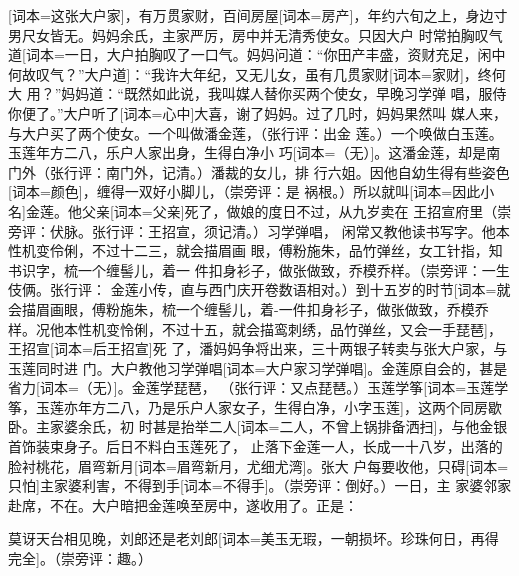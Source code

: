 \documentclass[UTF8,scheme=chinese,11pt,linespread=1.4]{ctexbook}
\makeatletter
\newcommand{\banben}[2][]{#2}
\newenvironment{diben}[1]
  {\list{}{\listparindent 2em
    \itemindent\listparindent
    \rightmargin 0em  %
    \leftmargin 0em  %
    \parsep \z@ \@plus\p@}%
   \item\relax}
  {\endlist}
\makeatother
\begin{document}
\begin{diben}
\banben{却说这张大户}[词本={这张大户家}]，有万贯家财，百间\banben{房屋}[词本={房产}]，年约六旬之上，身边寸
男尺女皆无。妈妈余氏，主家严厉，房中并无清秀使女。\banben{只因大户
时常拍胸叹气道}[词本={一日，大户拍胸叹了一口气。妈妈问道：“你田产丰盛，资财充足，闲中何故叹气？”大户道}]：“我许大年纪，又无儿女，虽有\banben{几贯家财}[词本={家财}]，终何大
用？”妈妈道：“既然如此说，我叫媒人替你买两个使女，早晚习学弹
唱，服侍你便了。”大户\banben{听了}[词本={心中}]大喜，谢了妈妈。过了几时，妈妈果然叫
媒人来，与大户买了两个使女。一个叫做潘金莲，（张行评：出金
莲。）一个唤做白玉莲。\banben{玉莲年方二八，乐户人家出身，生得白净小
巧}[词本={（无）}]。这潘金莲，却是南门外（张行评：南门外，记清。）潘裁的女儿，排
行六姐。因他自幼生得有些\banben{姿色}[词本={颜色}]，缠得一双好小脚儿，（崇旁评：是
祸根。）\banben{所以就叫}[词本={因此小名}]金莲。\banben{他父亲}[词本={父亲}]死了，做娘的度日不过，从九岁卖在
王招宣府里（崇旁评：伏脉。张行评：王招宣，须记清。）习学弹唱，
\banben{闲常又教他读书写字。他本性机变伶俐，不过十二三，就会描眉画
眼，傅粉施朱，品竹弹丝，女工针指，知书识字，梳一个缠髻儿，着一
件扣身衫子，做张做致，乔模乔样。（崇旁评：一生伎俩。张行评：
金莲小传，直与西门庆开卷数语相对。）到十五岁的时节}[词本={就会描眉画眼，傅粉施朱，梳一个缠髻儿，着-一件扣身衫子，做张做致，乔模乔样。况他本性机变怜俐，不过十五，就会描鸾刺绣，品竹弹丝，又会一手琵琶}]，\banben{王招宣}[词本={后王招宣}]死
了，潘妈妈争将出来，三十两银子转卖与张大户家，与玉莲同时进
门。\banben{大户教他习学弹唱}[词本={大户家习学弹唱}]。\banben{金莲原自会的，甚是省力}[词本={（无）}]。金莲学琵琶，
（张行评：又点琵琶。）\banben{玉莲学筝}[词本={玉莲学筝，玉莲亦年方二八，乃是乐户人家女子，生得白净，小字玉莲}]，这两个同房歇卧。主家婆余氏，初
时甚是抬举\banben{二人}[词本={二人，不曾上锅排备洒扫}]，与他金银首饰装束身子。后日不料白玉莲死了，
止落下金莲一人，长成一十八岁，出落的脸衬桃花，\banben{眉弯新月}[词本={眉弯新月，尤细尤湾}]。张大
户每要收他，\banben{只碍}[词本={只怕}]主家婆利害，\banben{不得到手}[词本={不得手}]。（崇旁评：倒好。）一日，主
家婆邻家赴席，不在。大户暗把金莲唤至房中，遂收用了。正是：

\banben{莫讶天台相见晚，刘郎还是老刘郎}[词本={美玉无瑕，一朝损坏。珍珠何日，再得完全}]。（崇旁评：趣。）


\end{diben}
\end{document}
